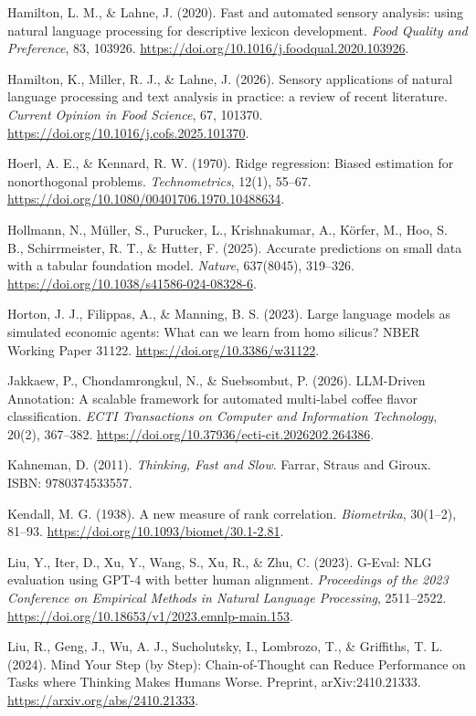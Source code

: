 \documentclass[11pt]{article}
\begin{document}
\noindent Hamilton, L. M., \& Lahne, J. (2020). Fast and automated sensory
analysis: using natural language processing for descriptive lexicon development.
\emph{Food Quality and Preference}, 83, 103926.
\url{https://doi.org/10.1016/j.foodqual.2020.103926}.

\noindent Hamilton, K., Miller, R. J., \& Lahne, J. (2026). Sensory
applications of natural language processing and text analysis in practice: a
review of recent literature. \emph{Current Opinion in Food Science}, 67, 101370.
\url{https://doi.org/10.1016/j.cofs.2025.101370}.

\noindent Hoerl, A. E., \& Kennard, R. W. (1970). Ridge regression: Biased
estimation for nonorthogonal problems. \emph{Technometrics}, 12(1), 55--67.
\url{https://doi.org/10.1080/00401706.1970.10488634}.

\noindent Hollmann, N., M\"uller, S., Purucker, L., Krishnakumar, A., K\"orfer,
M., Hoo, S. B., Schirrmeister, R. T., \& Hutter, F. (2025). Accurate predictions
on small data with a tabular foundation model. \emph{Nature}, 637(8045),
319--326. \url{https://doi.org/10.1038/s41586-024-08328-6}.

\noindent Horton, J. J., Filippas, A., \& Manning, B. S. (2023). Large language
models as simulated economic agents: What can we learn from homo silicus? NBER
Working Paper 31122. \url{https://doi.org/10.3386/w31122}.

\noindent Jakkaew, P., Chondamrongkul, N., \& Suebsombut, P. (2026). LLM-Driven
Annotation: A scalable framework for automated multi-label coffee flavor
classification. \emph{ECTI Transactions on Computer and Information
Technology}, 20(2), 367--382.
\url{https://doi.org/10.37936/ecti-cit.2026202.264386}.

\noindent Kahneman, D. (2011). \emph{Thinking, Fast and Slow}. Farrar, Straus
and Giroux. ISBN: 9780374533557.

\noindent Kendall, M. G. (1938). A new measure of rank correlation.
\emph{Biometrika}, 30(1--2), 81--93.
\url{https://doi.org/10.1093/biomet/30.1-2.81}.

\noindent Liu, Y., Iter, D., Xu, Y., Wang, S., Xu, R., \& Zhu, C. (2023).
G-Eval: NLG evaluation using GPT-4 with better human alignment. \emph{Proceedings
of the 2023 Conference on Empirical Methods in Natural Language Processing},
2511--2522. \url{https://doi.org/10.18653/v1/2023.emnlp-main.153}.

\noindent Liu, R., Geng, J., Wu, A. J., Sucholutsky, I., Lombrozo, T., \&
Griffiths, T. L. (2024). Mind Your Step (by Step): Chain-of-Thought can Reduce
Performance on Tasks where Thinking Makes Humans Worse. Preprint,
arXiv:2410.21333. \url{https://arxiv.org/abs/2410.21333}.
\end{document}
